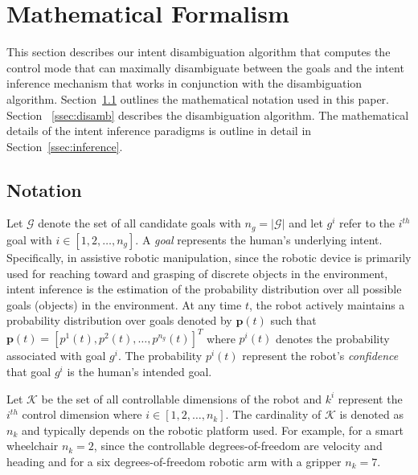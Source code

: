\section{Mathematical Formalism}\label{sec:ma}
This section describes our intent disambiguation algorithm that computes the control mode that can maximally disambiguate between the goals and the intent inference mechanism that works in conjunction with the disambiguation algorithm. Section~\ref{ssec:notation} outlines the mathematical notation used in this paper. Section ~\ref{ssec:disamb} describes the disambiguation algorithm. The mathematical details of the intent inference paradigms is outline in detail in Section~\ref{ssec:inference}.
\subsection{Notation}\label{ssec:notation}
Let $\mathcal{G}$ denote the set of all candidate goals with $n_g = \vert\mathcal{G}\vert$ and let $g^i$ refer to the $i^{th}$ goal with $i \in [1,2,\dots, n_g]$. A \textit{goal} represents the human's underlying intent. Specifically, in assistive robotic manipulation, since the robotic device is primarily used for reaching toward and grasping of discrete objects in the environment, intent inference is the estimation of the probability distribution over all possible goals (objects) in the environment. At any time $t$, the robot actively maintains a probability distribution over goals denoted by $\boldsymbol{p}(t)$ such that $\boldsymbol{p}(t) = [p^1(t), p^2(t),\dots, p^{n_g}(t)]^{T}$ where $p^i(t)$ denotes the probability associated with goal $g^i$.  The probability $p^i(t)$ represent the robot's \textit{confidence} that goal $g^i$ is the human's intended goal. 

Let $\mathcal{K}$ be the set of all controllable dimensions of the robot and $k^i$ represent the $i^{th}$ control dimension where $i \in [1,2,\dots,n_k]$. The cardinality of $\mathcal{K}$ is denoted as $n_k$ and typically depends on the robotic platform used. For example, for a smart wheelchair $n_k = 2$, since the controllable degrees-of-freedom are velocity and heading and for a six degrees-of-freedom robotic arm with a gripper $n_k = 7$. 

